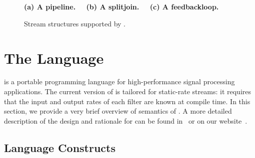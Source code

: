 \begin{figure}[t]
\begin{center}
\begin{comment}
\hspace{0.1in}
\psfig{figure=radio-ascoded.eps, width=2.8in}
\vspace{-36pt}
\caption{\protect\small Block diagram of the FM Radio.
\protect\label{fig:radio-ascoded}}
\vspace{10pt}
~~
\end{comment}
\begin{minipage}{0.46in}
\centering
{} \\
\end{minipage}
~
\begin{minipage}{1.3in}
\centering
{} \\
\end{minipage}
~
\begin{minipage}{1.02in}
\centering
{} \\
\end{minipage}
\\ ~ \\ {\bf \protect\small (a) A pipeline. ~~(b) A splitjoin. ~~(c) A feedbackloop.}
\caption{\protect\small Stream structures supported by \StreamIt.
\protect\label{fig:structures}} \vspace{-12pt}
\end{center}
\vspace{-12pt}
\end{figure}

\section{The \StreamIt Language}
\label{sec:streamit}

\StreamIt is a portable programming language for high-performance
signal processing applications.  The current version of \StreamIt
is tailored for static-rate streams: it requires that the input
and output rates of each filter are known at compile time.  In
this section, we provide a very brief overview of
semantics of \StreamIt.  A more detailed description of the design
and rationale for \StreamIt can be found in~\cite{thies02streamit} or
on our website~\cite{streamitweb}.

\subsection{Language Constructs}

